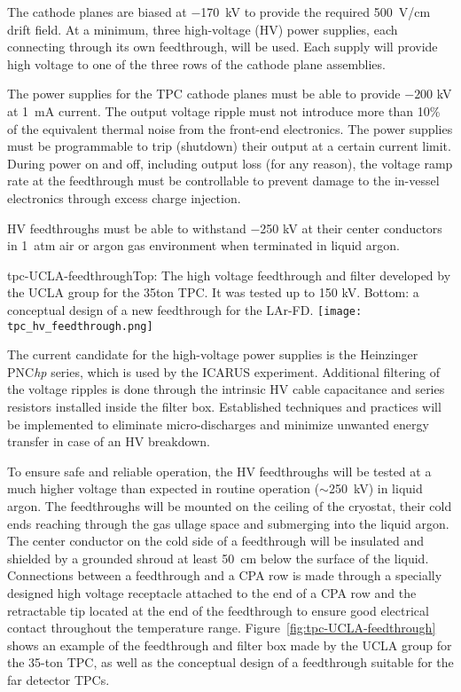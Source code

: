    The cathode planes are biased at $-$170~kV to provide the required 
500~V/cm drift field. At a minimum, three high-voltage (HV) power 
supplies, each connecting through its own feedthrough, will be used. Each supply will
provide high voltage to one of the three rows of the cathode plane assemblies.

The power supplies for the TPC cathode planes 
must be able to provide $-200$ kV at 1~mA current. The output voltage ripple 
must not introduce more than 10\% of the equivalent thermal noise from the front-end electronics. 
The power supplies must be programmable to trip (shutdown) 
their output at a certain current limit.  During power on and off, 
including output loss (for any reason), the voltage ramp rate at the 
feedthrough must be controllable to prevent 
damage to the in-vessel electronics through excess charge injection.

HV feedthroughs must be able to withstand $-$250 kV 
at their center conductors in 1~atm air or argon gas environment when terminated in liquid argon.

\begin{cdrfigure}{tpc-UCLA-feedthrough}{Top: The high voltage feedthrough and filter developed by the UCLA 
group for the 35ton TPC.  It was tested up to 150 kV.  Bottom: a conceptual design of a new feedthrough for the LAr-FD.}
\texttt{[image: tpc\_hv\_feedthrough.png]}
\end{cdrfigure}

The current candidate for the high-voltage power supplies is 
the Heinzinger PNC{\it hp} series, which is used by the ICARUS 
experiment.  Additional filtering of the voltage ripples is done through the intrinsic HV cable capacitance 
and series resistors installed inside the filter box. Established techniques and practices will be implemented to eliminate 
micro-discharges and minimize unwanted energy transfer in case of an HV breakdown. 
  
To ensure safe and reliable operation, the HV feedthroughs will be 
tested at a much higher voltage than expected in
routine operation ($\sim$250~kV) in liquid argon. 
 The feedthroughs will be 
mounted on the ceiling of the cryostat, their cold ends reaching 
through the gas ullage space and submerging into the liquid argon. 
The center conductor on the cold side of a feedthrough will be 
insulated and shielded by a grounded shroud at least 50~cm below the 
surface of the liquid. Connections between a feedthrough 
and a CPA row is made through a specially designed high voltage receptacle attached to the end of a CPA row and the retractable tip located at the end of the feedthrough to ensure good electrical contact throughout the temperature range. Figure~\ref{fig:tpc-UCLA-feedthrough} shows an example 
of the feedthrough and filter box made by the UCLA group for the 35-ton TPC, as well as the conceptual design of a feedthrough suitable for the far detector TPCs.

